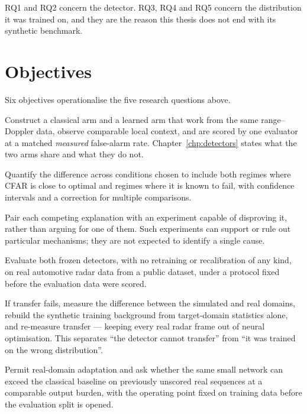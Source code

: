 RQ1 and RQ2 concern the detector. RQ3, RQ4 and RQ5 concern the distribution it was trained on, and
they are the reason this thesis does not end with its synthetic benchmark.

\section{Objectives}

Six objectives operationalise the five research questions above.

\begin{description}
\itemsep3pt
\item[O1 --- Build a controlled comparison.] Construct a classical arm and a learned arm that work
from the same range--Doppler data, observe comparable local context, and are scored by one evaluator
at a matched \emph{measured} false-alarm rate. Chapter~\ref{chp:detectors} states what the two arms
share and what they do not.

\item[O2 --- Measure the margin.] Quantify the difference across conditions chosen to include both
regimes where CFAR is close to optimal and regimes where it is known to fail, with confidence
intervals and a correction for multiple comparisons.

\item[O3 --- Attribute the margin.] Pair each competing explanation with an experiment
capable of disproving it, rather than arguing for one of them. Such experiments can support or rule
out particular mechanisms; they are not expected to identify a single cause.

\item[O4 --- Test external validity.] Evaluate both frozen detectors, with no retraining or
recalibration of any kind, on real automotive radar data from a public dataset, under a protocol
fixed before the evaluation data were scored.

\item[O5 --- Test the training domain.] If transfer fails, measure the difference between the
simulated and real domains, rebuild the synthetic training background from target-domain statistics
alone, and re-measure transfer --- keeping every real radar frame out of neural optimisation. This
separates ``the detector cannot transfer'' from ``it was trained on the wrong distribution''.

\item[O6 --- Test what real supervision adds.] Permit real-domain adaptation and ask whether the
same small network can exceed the classical baseline on previously unscored real sequences at a
comparable output burden, with the operating point fixed on training data before the evaluation
split is opened.
\end{description}

